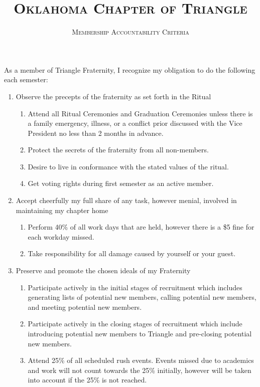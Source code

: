 \documentclass{article}
\title{\textsc{Oklahoma Chapter of Triangle}}
\subtitle{\textsc{Membership Accountability Criteria}}
\begin{document}
\maketitle

\setlength\parindent{0pt}

As a member of Triangle Fraternity, I recognize my obligation to do the following each semester:

\begin{enumerate}
    \item Observe the precepts of the fraternity as set forth in the Ritual
    \begin{enumerate}
        \item Attend all Ritual Ceremonies and Graduation Ceremonies unless there is a family emergency, illness, or a conflict prior discussed with the Vice President no less than 2 months in advance.
        \item Protect the secrets of the fraternity from all non-members.
        \item Desire to live in conformance with the stated values of the ritual.
        \item Get voting rights during first semester as an active member.
    \end{enumerate}
    \item Accept cheerfully my full share of any task, however menial, involved in maintaining my chapter home
    \begin{enumerate}
        \item Perform 40\% of all work days that are held, however there is a \$5 fine for each workday missed.
        \item Take responsibility for all damage caused by yourself or your guest.
    \end{enumerate}
    \item Preserve and promote the chosen ideals of my Fraternity
    \begin{enumerate}
        \item Participate actively in the initial stages of recruitment which includes generating lists of potential new members, calling potential new members, and meeting potential new members.
        \item Participate actively in the closing stages of recruitment which include introducing potential new members to Triangle and pre-closing potential new members.
        \item Attend 25\% of all scheduled rush events. Events missed due to academics and work will not count towards the 25\% initially, however will be taken into account if the 25\% is not reached.

\end{enumerate}
\end{enumerate}
\end{document}
